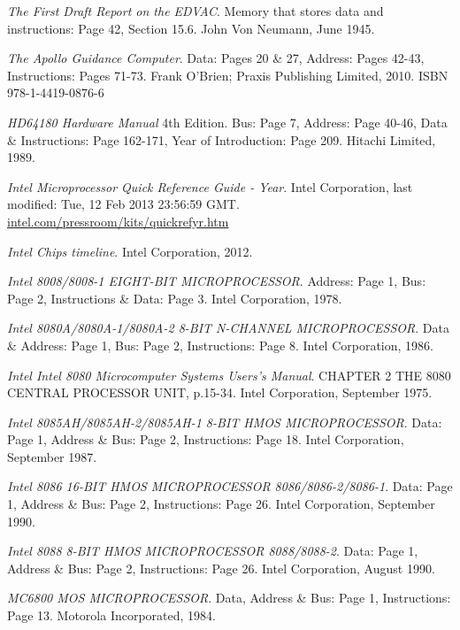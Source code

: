 \documentclass[twoside,twocolumn]{article}
\begin{document}
\begin{thebibliography}{99} %

\textit{The First Draft Report on the EDVAC}.
Memory that stores data and instructions: Page 42, Section 15.6.
John Von Neumann, June 1945.

\textit{The Apollo Guidance Computer}.
Data: Pages 20 \& 27, Address: Pages 42-43, Instructions: Pages 71-73.
Frank O'Brien; Praxis Publishing Limited, 2010.
ISBN 978-1-4419-0876-6

\textit{HD64180 Hardware Manual} 4th Edition.
Bus: Page 7, Address: Page 40-46, Data \& Instructions: Page 162-171, Year of Introduction: Page 209.
Hitachi Limited, 1989.

\textit{Intel Microprocessor Quick Reference Guide - Year}.
Intel Corporation, last modified: Tue, 12 Feb 2013 23:56:59 GMT.
\href{https://www.intel.com/pressroom/kits/quickrefyr.htm}{intel.com/pressroom/kits/quickrefyr.htm}

\textit{Intel Chips timeline}.
Intel Corporation, 2012.

\textit{Intel 8008/8008-1 EIGHT-BIT MICROPROCESSOR}.
Address: Page 1, Bus: Page 2, Instructions \& Data: Page 3.
Intel Corporation, 1978.

\textit{Intel 8080A/8080A-1/8080A-2 8-BIT N-CHANNEL MICROPROCESSOR}.
Data \& Address: Page 1, Bus: Page 2, Instructions: Page 8.
Intel Corporation, 1986.

\textit{Intel Intel 8080 Microcomputer Systems Users's Manual}.
CHAPTER 2 THE 8080 CENTRAL PROCESSOR UNIT, p.15-34.
Intel Corporation, September 1975.

\textit{Intel 8085AH/8085AH-2/8085AH-1 8-BIT HMOS MICROPROCESSOR}.
Data: Page 1, Address \& Bus: Page 2, Instructions: Page 18.
Intel Corporation, September 1987.

\textit{Intel 8086 16-BIT HMOS MICROPROCESSOR 8086/8086-2/8086-1}.
Data: Page 1, Address \& Bus: Page 2, Instructions: Page 26.
Intel Corporation, September 1990.

\textit{Intel 8088 8-BIT HMOS MICROPROCESSOR 8088/8088-2}.
Data: Page 1, Address \& Bus: Page 2, Instructions: Page 26.
Intel Corporation, August 1990.

\textit{MC6800 MOS MICROPROCESSOR}.
Data, Address \& Bus: Page 1, Instructions: Page 13.
Motorola Incorporated, 1984.


\end{thebibliography}
\end{document}
